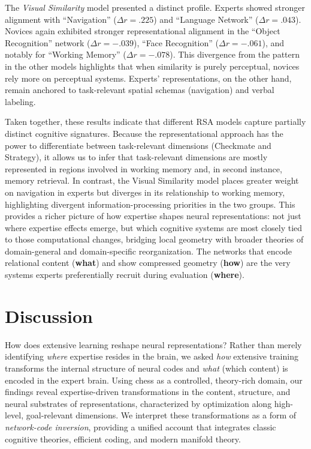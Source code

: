 \documentclass[preprint,12pt]{elsarticle}
\begin{document}
The \textit{Visual Similarity} model presented a distinct profile. Experts showed stronger alignment with ``Navigation'' ($\Delta r = .225$) and ``Language Network'' ($\Delta r = .043$). Novices again exhibited stronger representational alignment in the ``Object Recognition'' network ($\Delta r = -.039$), ``Face Recognition'' ($\Delta r = -.061$), and notably for ``Working Memory'' ($\Delta r = -.078$). This divergence from the pattern in the other models highlights that when similarity is purely perceptual, novices rely more on perceptual systems. Experts' representations, on the other hand, remain anchored to task-relevant spatial schemas (navigation) and verbal labeling. 

Taken together, these results indicate that different RSA models capture partially distinct cognitive signatures. Because the representational approach has the power to differentiate between task-relevant dimensions (Checkmate and Strategy), it allows us to infer that task-relevant dimensions are mostly represented in regions involved in working memory and, in second instance, memory retrieval. In contrast, the Visual Similarity model places greater weight on navigation in experts but diverges in its relationship to working memory, highlighting divergent information-processing priorities in the two groups. This provides a richer picture of how expertise shapes neural representations: not just where expertise effects emerge, but which cognitive systems are most closely tied to those computational changes, bridging local geometry with broader theories of domain-general and domain-specific reorganization. The networks that encode relational content (\textbf{what}) and show compressed geometry (\textbf{how}) are the very systems experts preferentially recruit during evaluation (\textbf{where}).

\section{Discussion}

How does extensive learning reshape neural representations? Rather than merely identifying \emph{where} expertise resides in the brain, we asked \emph{how} extensive training transforms the internal structure of neural codes and \textit{what} (which content) is encoded in the expert brain. Using chess as a controlled, theory-rich domain, our findings reveal expertise-driven transformations in the content, structure, and neural substrates of representations, characterized by optimization along high-level, goal-relevant dimensions. We interpret these transformations as a form of \textit{network-code inversion}, providing a unified account that integrates classic cognitive theories, efficient coding, and modern manifold theory.
\end{document}

